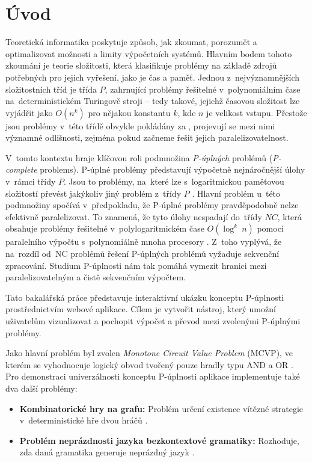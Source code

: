\chapter{Úvod}
\label{sec:Introduction}

Teoretická informatika poskytuje způsob, jak zkoumat, porozumět a optimalizovat možnosti a limity výpočetních systémů. Hlavním bodem tohoto zkoumání je teorie složitosti, která klasifikuje problémy na základě zdrojů potřebných pro jejich vyřešení, jako je čas a paměť. Jednou z~nejvýznamnějších složitostních tříd je třída \( P \), zahrnující problémy řešitelné v~polynomiálním čase na~deterministickém Turingově stroji \cite{uti_turing} – tedy takové, jejichž časovou složitost lze vyjádřit jako \( O(n^k) \) \cite{sawa_bigo} pro nějakou konstantu \( k \), kde \( n \) je velikost vstupu. Přestože jsou problémy v~této třídě obvykle pokládány za , projevují se mezi nimi významné odlišnosti, zejména pokud začneme řešit jejich paralelizovatelnost.

V~tomto kontextu hraje klíčovou roli podmnožina \emph{P-úplných} problémů (\emph{P-complete} problems). P-úplné problémy představují výpočetně nejnáročnější úlohy v~rámci třídy \( P \). Jsou to problémy, na~které lze s~logaritmickou paměťovou složitostí převést jakýkoliv jiný problém z~třídy \( P \) \cite{papadimitriou, arora}. Hlavní problém u~této podmnožiny spočívá v~předpokladu, že P-úplné problémy pravděpodobně nelze efektivně paralelizovat. To znamená, že tyto úlohy nespadají do~třídy \( NC \), která obsahuje problémy řešitelné v~polylogaritmickém čase \( O(\log^k~n) \) pomocí paralelního výpočtu s~polynomiálně mnoha procesory \cite{sawa}. Z~toho vyplývá, že na~rozdíl od~NC problémů řešení P-úplných problémů vyžaduje sekvenční zpracování. Studium P-úplnosti nám tak pomáhá vymezit hranici mezi paralelizovatelným a čistě sekvenčním výpočtem.

Tato bakalářská práce představuje interaktivní ukázku konceptu P-úplnosti prostřednictvím webové aplikace. Cílem je vytvořit nástroj, který umožní uživatelům vizualizovat a pochopit výpočet a převod mezi zvolenými P-úplnými problémy.

Jako hlavní problém byl zvolen \emph{Monotone Circuit Value Problem} (MCVP), ve kterém se vyhodnocuje logický obvod tvořený pouze hradly typu AND a OR \cite{sawa}. Pro demonstraci univerzálnosti konceptu P-úplnosti aplikace implementuje také dva další problémy:
\begin{itemize}
    \item \textbf{Kombinatorické hry na grafu:} Problém určení existence vítězné strategie v~deterministické hře dvou hráčů \cite{sawa}.
    \item \textbf{Problém neprázdnosti jazyka bezkontextové gramatiky:} Rozhoduje, zda daná gramatika generuje neprázdný jazyk \cite{sawa}.
\end{itemize}

